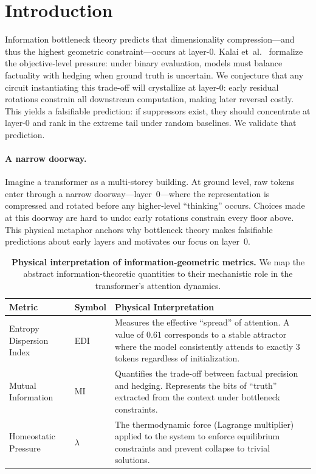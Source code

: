 \section{Introduction}

Information bottleneck theory predicts that dimensionality compression—and thus the highest geometric constraint—occurs at layer-0. Kalai et~al.~\cite{kalai2025why} formalize the objective-level pressure: under binary evaluation, models must balance factuality with hedging when ground truth is uncertain. We conjecture that any circuit instantiating this trade-off will crystallize at layer-0: early residual rotations constrain all downstream computation, making later reversal costly. This yields a falsifiable prediction: if suppressors exist, they should concentrate at layer-0 and rank in the extreme tail under random baselines. We validate that prediction.

\paragraph{A narrow doorway.}
Imagine a transformer as a multi‑storey building. At ground level, raw tokens enter through a narrow doorway—layer~0—where the representation is compressed and rotated before any higher‑level “thinking” occurs. Choices made at this doorway are hard to undo: early rotations constrain every floor above. This physical metaphor anchors why bottleneck theory makes falsifiable predictions about early layers and motivates our focus on layer~0.

\begin{table}[t]
    \centering
    \caption{\textbf{Physical interpretation of information-geometric metrics.} We map the abstract information-theoretic quantities to their mechanistic role in the transformer's attention dynamics.}
    \label{tab:metric_map}
    \begin{tabular}{@{}llp{8cm}@{}}
    \toprule
    \textbf{Metric} & \textbf{Symbol} & \textbf{Physical Interpretation} \\ \midrule
    Entropy Dispersion Index & EDI & Measures the effective ``spread'' of attention. A value of $0.61$ corresponds to a stable attractor where the model consistently attends to exactly 3 tokens regardless of initialization. \\ \addlinespace
    Mutual Information & MI & Quantifies the trade-off between factual precision and hedging. Represents the bits of ``truth'' extracted from the context under bottleneck constraints. \\ \addlinespace
    Homeostatic Pressure & $\lambda$ & The thermodynamic force (Lagrange multiplier) applied to the system to enforce equilibrium constraints and prevent collapse to trivial solutions. \\ \bottomrule
    \end{tabular}
\end{table}

